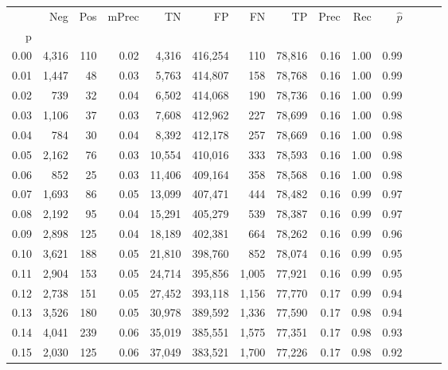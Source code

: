 \begin{tabular}{rrrrrrrrrrrrrr}
\toprule
{} &     Neg &    Pos & mPrec &       TN &       FP &      FN &      TP &  Prec &   Rec & $\hat{p}$ \\
p    &         &        &       &          &          &         &         &       &       &           \\
\midrule
0.00 &   4,316 &    110 &  0.02 &    4,316 &  416,254 &     110 &  78,816 &  0.16 &  1.00 &      0.99 \\
0.01 &   1,447 &     48 &  0.03 &    5,763 &  414,807 &     158 &  78,768 &  0.16 &  1.00 &      0.99 \\
0.02 &     739 &     32 &  0.04 &    6,502 &  414,068 &     190 &  78,736 &  0.16 &  1.00 &      0.99 \\
0.03 &   1,106 &     37 &  0.03 &    7,608 &  412,962 &     227 &  78,699 &  0.16 &  1.00 &      0.98 \\
0.04 &     784 &     30 &  0.04 &    8,392 &  412,178 &     257 &  78,669 &  0.16 &  1.00 &      0.98 \\
0.05 &   2,162 &     76 &  0.03 &   10,554 &  410,016 &     333 &  78,593 &  0.16 &  1.00 &      0.98 \\
0.06 &     852 &     25 &  0.03 &   11,406 &  409,164 &     358 &  78,568 &  0.16 &  1.00 &      0.98 \\
0.07 &   1,693 &     86 &  0.05 &   13,099 &  407,471 &     444 &  78,482 &  0.16 &  0.99 &      0.97 \\
0.08 &   2,192 &     95 &  0.04 &   15,291 &  405,279 &     539 &  78,387 &  0.16 &  0.99 &      0.97 \\
0.09 &   2,898 &    125 &  0.04 &   18,189 &  402,381 &     664 &  78,262 &  0.16 &  0.99 &      0.96 \\
0.10 &   3,621 &    188 &  0.05 &   21,810 &  398,760 &     852 &  78,074 &  0.16 &  0.99 &      0.95 \\
0.11 &   2,904 &    153 &  0.05 &   24,714 &  395,856 &   1,005 &  77,921 &  0.16 &  0.99 &      0.95 \\
0.12 &   2,738 &    151 &  0.05 &   27,452 &  393,118 &   1,156 &  77,770 &  0.17 &  0.99 &      0.94 \\
0.13 &   3,526 &    180 &  0.05 &   30,978 &  389,592 &   1,336 &  77,590 &  0.17 &  0.98 &      0.94 \\
0.14 &   4,041 &    239 &  0.06 &   35,019 &  385,551 &   1,575 &  77,351 &  0.17 &  0.98 &      0.93 \\
0.15 &   2,030 &    125 &  0.06 &   37,049 &  383,521 &   1,700 &  77,226 &  0.17 &  0.98 &      0.92 \\

\end{tabular}
